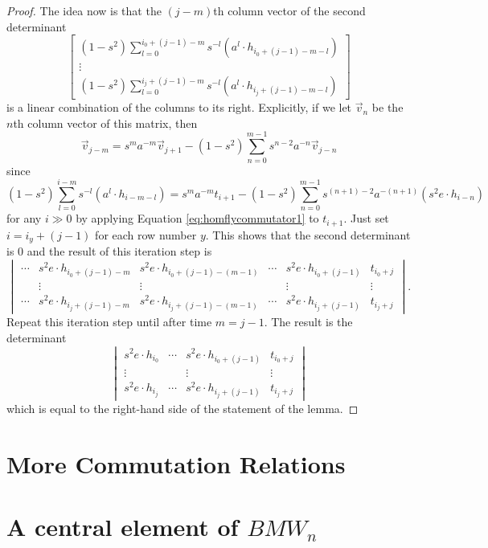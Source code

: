 \begin{proof}
The idea now is that the $(j-m)$th column vector of the second determinant
\[
\begin{bmatrix}
( 1 - s^2 ) \sum_{l=0}^{i_0+(j-1)-m} s^{-l} ( a^l \cdot h_{i_0+(j-1)-m-l} ) \\
\vdots \\
( 1 - s^2 ) \sum_{l=0}^{i_j+(j-1)-m} s^{-l} ( a^l \cdot h_{i_j+(j-1)-m-l} ) 
\end{bmatrix}
\]
is a linear combination of the columns to its right. Explicitly, if we let $\vec{v}_n$ be the $n$th column vector of this matrix, then
\[
\vec{v}_{j-m} = s^m a^{-m} \vec{v}_{j+1} - ( 1 - s^2 ) \sum_{n=0}^{m-1} s^{n-2} a^{-n} \vec{v}_{j-n}
\]
since
\[
( 1 - s^2 ) \sum_{l=0}^{i-m} s^{-l} ( a^l \cdot h_{i-m-l} ) = s^m a^{-m} t_{i+1} - (1 - s^2 ) \sum_{n=0}^{m-1} s^{(n+1)-2} a^{-(n+1)} ( s^2 e \cdot h_{i-n} )
\]
for any $i \gg 0$ by applying Equation \eqref{eq:homflycommutator1} to $t_{i+1}$. Just set $i = i_y + (j-1)$ for each row number $y$. This shows that the second determinant is $0$ and the result of this iteration step is 
\[
\begin{vmatrix}
\cdots & s^2 e \cdot h_{i_0+(j-1)-m} & s^2 e \cdot h_{i_0+(j-1)-(m-1)} & \cdots & s^2 e \cdot h_{i_0 + (j-1)} & t_{i_0 + j} \\
 & \vdots & \vdots & & \vdots & \vdots \\
\cdots & s^2 e \cdot h_{i_j+(j-1)-m} & s^2 e \cdot h_{i_j+(j-1)-(m-1)} & \cdots & s^2 e \cdot h_{i_j + (j-1)} & t_{i_j + j}
\end{vmatrix}.
\]
Repeat this iteration step until after time $m=j-1$. The result is the determinant
\[
\begin{vmatrix}
s^2 e \cdot h_{i_0} & \cdots & s^2 e \cdot h_{i_0 + (j-1)} & t_{i_0 + j} \\
\vdots & & \vdots & \vdots \\
s^2 e \cdot h_{i_j} & \cdots & s^2 e \cdot h_{i_j + (j-1)} & t_{i_j + j}
\end{vmatrix}
\]
which is equal to the right-hand side of the statement of the lemma. 
\end{proof}



\section{More Commutation Relations}


\section{A central element of $BMW_n$}

